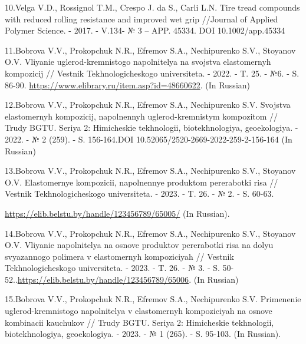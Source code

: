 \begin{references}
10.Velga V.D., Rossignol T.M., Crespo J. da S., Carli L.N. Tire tread
compounds with reduced rolling resistance and improved wet grip
//Journal of Applied Polymer Science. - 2017. - V.134- № 3 -- APP.
45334. DOI 10.1002/app.45334

11.Bobrova V.V., Prokopchuk N.R., Efremov S.A., Nechipurenko S.V.,
Stoyanov O.V. Vliyanie uglerod-kremnistogo napolnitelya na svojstva
elastomernyh kompozicij // Vestnik Tekhnologicheskogo universiteta. -
2022. - T. 25. - №6. - S. 86-90.
\url{https://www.elibrary.ru/item.asp?id=48660622}. (In Russian)

12.Bobrova V.V., Prokopchuk N.R., Efremov S.A., Nechipurenko S.V.
Svojstva elastomernyh kompozicij, napolnennyh uglerod-kremnistym
kompozitom // Trudy BGTU. Seriya 2: Himicheskie tekhnologii,
biotekhnologiya, geoekologiya. - 2022. - № 2 (259). - S. 156-164.DOI
10.52065/2520-2669-2022-259-2-156-164 (In Russian)

13.Bobrova V.V., Prokopchuk N.R., Efremov S.A., Nechipurenko S.V.,
Stoyanov O.V. Elastomernye kompozicii, napolnennye produktom pererabotki
risa // Vestnik Tekhnologicheskogo universiteta. - 2023. - T. 26. - № 2.
- S. 60-63.

\url{https://elib.belstu.by/handle/123456789/65005/} (In Russian).

14.Bobrova V.V., Prokopchuk N.R., Efremov S.A., Nechipurenko S.V.,
Stoyanov O.V. Vliyanie napolnitelya na osnove produktov pererabotki risa
na dolyu svyazannogo polimera v elastomernyh kompoziciyah // Vestnik
Tekhnologicheskogo universiteta. - 2023. - T. 26. - № 3. - S.
50-52..\url{https://elib.belstu.by/handle/123456789/65006}. (In Russian)

15.Bobrova V.V., Prokopchuk N.R., Efremov S.A., Nechipurenko S.V.
Primenenie uglerod-kremnistogo napolnitelya v elastomernyh kompoziciyah
na osnove kombinacii kauchukov // Trudy BGTU. Seriya 2: Himicheskie
tekhnologii, biotekhnologiya, geoekologiya. - 2023. - № 1 (265). - S.
95-103. (In Russian).
\end{references}

